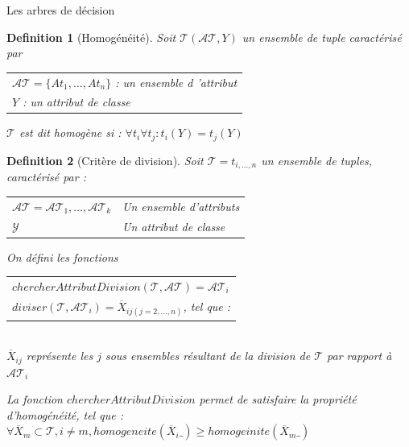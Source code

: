 \documentclass[a4paper, 11pt]{report}
\newtheorem{definition}{Definition}
\newcommand{\set}[1]{\ensuremath{\overline{#1}}}
\newcommand{\tupleset}{\ensuremath{\mathcal{T}}}
\newcommand{\classeset}{\ensuremath{\mathcal{Y}}}
\newcommand{\attributset}{\ensuremath{\mathcal{AT}}}
\begin{document}
\begin{chapter}{Les arbres de décision}
\begin{definition}[Homogénéité]

Soit $\tupleset(\attributset, Y)$ un ensemble de tuple caractérisé par \\
\begin{center}
\begin{tabular}{l}
$\attributset = \{At_1,\dots,At_n\}$ : un ensemble d 'attribut\\
$Y$ : un attribut de classe
\end{tabular}
\end{center}
$\tupleset$ est dit homogène si : $\forall{t_i}\forall{t_j} : t_i(Y) = t_j(Y)$ 

\end{definition}

\begin{definition}[Critère de division]
Soit $\tupleset=t_{i,\dots,n}$ un ensemble de tuples, caractérisé par : \\

\begin{center}
\begin{tabular}{l l}
$\attributset=\attributset_1,\dots,\attributset_k$&Un ensemble d'attributs \\
$\classeset$&Un attribut de classe\\
\end{tabular}
\end{center}
On défini les fonctions \\
\begin{center}
\begin{tabular}{l}
$chercherAttributDivision(\tupleset,\attributset) = \attributset_i$ \\
$diviser(\tupleset,\attributset_i) = \set X_{ij(j=2,\dots,n)}$, tel que :\\
\end{tabular}
\\$\set X_{ij}$ représente les $j$ sous ensembles résultant de la division de $\tupleset$ par rapport à $\attributset_i$\\
\end{center}
La fonction $chercherAttributDivision$ permet de satisfaire la propriété d'homogénéité, tel que :\\
$\forall{\set X_{m}} \subset \tupleset, i\neq m, homogeneite(\set X_i\_) \geq homogeinite(\set X_m\_)$

\end{definition}



\end{chapter}
\end{document}
